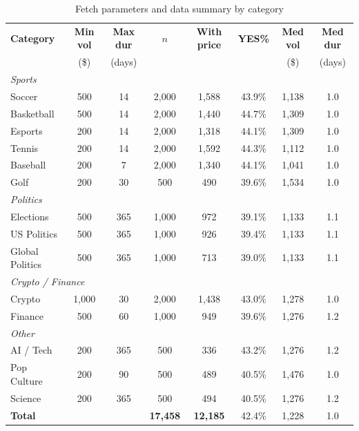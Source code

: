 \documentclass[11pt,a4paper]{article}
\begin{document}
\begin{table}[H]
\centering
\caption{Fetch parameters and data summary by category}
\label{tab:fetch}
\small
\begin{tabular}{lccccccc}
\toprule
\textbf{Category} & \textbf{Min vol} & \textbf{Max dur} & \textbf{$n$} & \textbf{With price} & \textbf{YES\%} & \textbf{Med vol} & \textbf{Med dur} \\
 & (\$) & (days) & & & & (\$) & (days) \\
\midrule
\multicolumn{8}{l}{\textit{Sports}} \\
Soccer           & 500 & 14 & 2{,}000 & 1{,}588 & 43.9\% & 1{,}138 & 1.0 \\
Basketball       & 500 & 14 & 2{,}000 & 1{,}440 & 44.7\% & 1{,}309 & 1.0 \\
Esports          & 200 & 14 & 2{,}000 & 1{,}318 & 44.1\% & 1{,}309 & 1.0 \\
Tennis           & 200 & 14 & 2{,}000 & 1{,}592 & 44.3\% & 1{,}112 & 1.0 \\
Baseball         & 200 &  7 & 2{,}000 & 1{,}340 & 44.1\% & 1{,}041 & 1.0 \\
Golf             & 200 & 30 &   500   &   490   & 39.6\% & 1{,}534 & 1.0 \\
\midrule
\multicolumn{8}{l}{\textit{Politics}} \\
Elections        & 500 & 365 & 1{,}000 &  972 & 39.1\% & 1{,}133 & 1.1 \\
US Politics      & 500 & 365 & 1{,}000 &  926 & 39.4\% & 1{,}133 & 1.1 \\
Global Politics  & 500 & 365 & 1{,}000 &  713 & 39.0\% & 1{,}133 & 1.1 \\
\midrule
\multicolumn{8}{l}{\textit{Crypto / Finance}} \\
Crypto           & 1{,}000 & 30 & 2{,}000 & 1{,}438 & 43.0\% & 1{,}278 & 1.0 \\
Finance          & 500     & 60 & 1{,}000 &   949   & 39.6\% & 1{,}276 & 1.2 \\
\midrule
\multicolumn{8}{l}{\textit{Other}} \\
AI / Tech        & 200 & 365 & 500 & 336 & 43.2\% & 1{,}276 & 1.2 \\
Pop Culture      & 200 &  90 & 500 & 489 & 40.5\% & 1{,}476 & 1.0 \\
Science          & 200 & 365 & 500 & 494 & 40.5\% & 1{,}276 & 1.2 \\
\midrule
\textbf{Total}   &     &     & \textbf{17{,}458} & \textbf{12{,}185} & 42.4\% & 1{,}228 & 1.0 \\
\bottomrule
\end{tabular}
\end{table}
\end{document}

